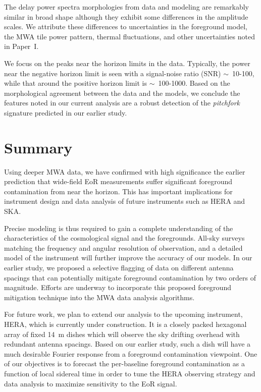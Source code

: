 \documentclass[preprint2,apjl,numberedappendix,twocolappendix,appendixfloats]{emulateapj}
\begin{document}
The delay power spectra morphologies from data and modeling are remarkably similar in broad shape although they exhibit some differences in the amplitude scales. We attribute these differences to uncertainties in the foreground model, the MWA tile power pattern, thermal fluctuations, and other uncertainties noted in Paper~I. 

We focus on the peaks near the horizon limits in the data. Typically, the power near the negative horizon limit is seen with a signal-noise ratio (SNR) $\sim$~10-100, while that around the positive horizon limit is $\sim$~100-1000. %
Based on the morphological agreement between the data and the models, we conclude the features noted in our current analysis are a robust detection of the {\it pitchfork} signature predicted in our earlier study.

\section{Summary}\label{sec:summary}

Using deeper MWA data, we have confirmed with high significance the earlier prediction that wide-field EoR measurements suffer significant foreground contamination from near the horizon. This has important implications for instrument design and data analysis of future instruments such as HERA and SKA. 

Precise modeling is thus required to gain a complete understanding of the characteristics of the cosmological signal and the foregrounds. All-sky surveys matching the frequency and angular resolution of observation, and a detailed model of the instrument will further improve the accuracy of our models. In our earlier study, we proposed a selective flagging of data on different antenna spacings that can potentially mitigate foreground contamination by two orders of magnitude. Efforts are underway to incorporate this proposed foreground mitigation technique into the MWA data analysis algorithms.

For future work, we plan to extend our analysis to the upcoming instrument, HERA, which is currently under construction. It is a closely packed hexagonal array of fixed 14~m dishes which will observe the sky drifting overhead with redundant antenna spacings. Based on our earlier study, such a dish will have a much desirable Fourier response from a foreground contamination viewpoint. One of our objectives is to forecast the per-baseline foreground contamination as a function of local sidereal time in order to tune the HERA observing strategy and data analysis to maximize sensitivity to the EoR signal.
\end{document}
